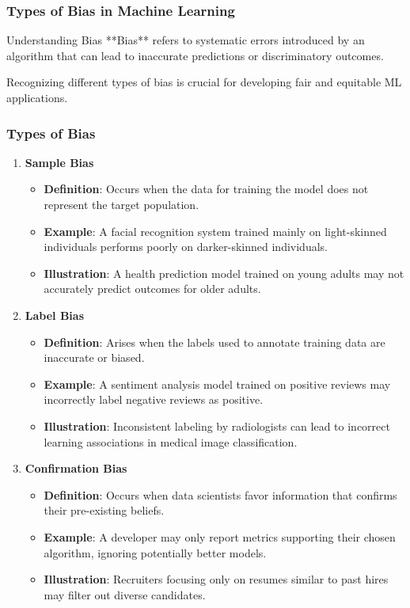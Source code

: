 \documentclass[aspectratio=169]{beamer}
\begin{document}
\begin{frame}[fragile]
    \frametitle{Types of Bias in Machine Learning}
    \begin{block}{Understanding Bias}
        **Bias** refers to systematic errors introduced by an algorithm that can lead to inaccurate predictions or discriminatory outcomes.
    \end{block}
    Recognizing different types of bias is crucial for developing fair and equitable ML applications.
\end{frame}

\begin{frame}[fragile]
    \frametitle{Types of Bias}
    \begin{enumerate}
        \item \textbf{Sample Bias}
        \begin{itemize}
            \item \textbf{Definition}: Occurs when the data for training the model does not represent the target population.
            \item \textbf{Example}: A facial recognition system trained mainly on light-skinned individuals performs poorly on darker-skinned individuals.
            \item \textbf{Illustration}: A health prediction model trained on young adults may not accurately predict outcomes for older adults.
        \end{itemize}
        
        \item \textbf{Label Bias}
        \begin{itemize}
            \item \textbf{Definition}: Arises when the labels used to annotate training data are inaccurate or biased.
            \item \textbf{Example}: A sentiment analysis model trained on positive reviews may incorrectly label negative reviews as positive.
            \item \textbf{Illustration}: Inconsistent labeling by radiologists can lead to incorrect learning associations in medical image classification.
        \end{itemize}
        
        \item \textbf{Confirmation Bias}
        \begin{itemize}
            \item \textbf{Definition}: Occurs when data scientists favor information that confirms their pre-existing beliefs.
            \item \textbf{Example}: A developer may only report metrics supporting their chosen algorithm, ignoring potentially better models.
            \item \textbf{Illustration}: Recruiters focusing only on resumes similar to past hires may filter out diverse candidates.
        \end{itemize}
    \end{enumerate}
\end{frame}
\end{document}

